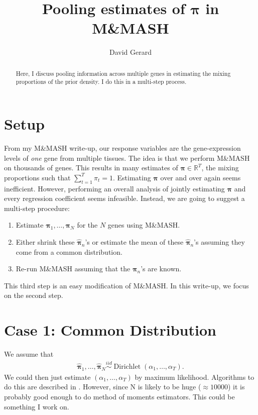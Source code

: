 \documentclass[11pt,authoryear]{article}
\DeclareMathOperator*{\dir}{Dirichlet}
\newcommand{\bs}[1]{\boldsymbol{#1}}
\begin{document}
\singlespacing
\title{Pooling estimates of $\bs{\pi}$ in M\&MASH}
\author{David Gerard}
\maketitle

\begin{abstract}
  Here, I discuss pooling information across multiple genes in
  estimating the mixing proportions of the prior density. I do this in
  a multi-step process.
\end{abstract}

\section{Setup}
From my M\&MASH write-up, our response variables are the
gene-expression levels of \emph{one} gene from multiple tissues. The
idea is that we perform M\&MASH on thousands of genes. This results in
many estimates of $\bs{\pi} \in \mathbb{R}^T$, the mixing proportions
such that $\sum_{t = 1}^T\pi_{t} = 1$. Estimating $\bs{\pi}$ over and
over again seems inefficient. However, performing an overall analysis
of jointly estimating $\bs{\pi}$ and every regression coefficient
seems infeasible. Instead, we are going to suggest a multi-step procedure:
\begin{enumerate}
\item Estimate $\bs{\pi}_1,\ldots,\bs{\pi}_N$ for the $N$ genes using M\&MASH.
\item Either shrink these $\hat{\bs{\pi}}_n$'s or estimate the mean of these
  $\hat{\bs{\pi}}_n$'s assuming they come from a common distribution.
\item Re-run M\&MASH assuming that the $\bs{\pi}_n$'s are known.
\end{enumerate}
This third step is an easy modification of M\&MASH. In this write-up, we focus on the second step.

\section{Case 1: Common Distribution}
We assume that
\begin{align}
\hat{\bs{\pi}}_1,\ldots,\hat{\bs{\pi}}_N \overset{iid}{\sim} \dir(\alpha_1,\ldots,\alpha_T).
\end{align}
We could then just estimate $(\alpha_1,\ldots,\alpha_T)$ by maximum
likelihood. Algorithms to do this are described in
\citet{minka2000estimating}. However, since N is likely to be huge
($\approx 10000$) it is probably good enough to do method of moments
estimators. This could be something I work on.
\end{document}
